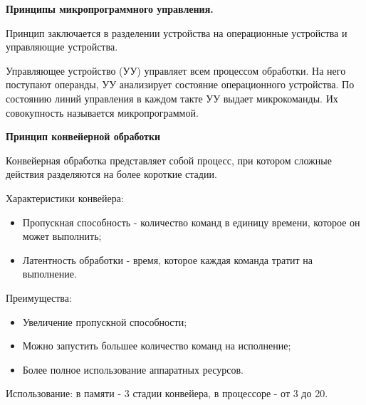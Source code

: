 
\textbf{Принципы микропрограммного управления.}


Принцип заключается в разделении устройства на операционные устройства и
управляющие устройства. 

Управляющее устройство (УУ) управляет всем процессом обработки. На него
поступают операнды, УУ анализирует состояние операционного устройства. По
состоянию линий управления в каждом такте УУ выдает микрокоманды. Их
совокупность называется микропрограммой.

\textbf{Принцип конвейерной обработки}

Конвейерная обработка представляет собой процесс, при котором сложные действия
разделяются на более короткие стадии. 

Характеристики конвейера:
\begin{itemize}[left=\parindent]
\item Пропускная способность - количество команд в единицу времени, которое он
может выполнить;
\item Латентность обработки - время, которое каждая команда тратит на
выполнение.
\end{itemize}

Преимущества:
\begin{itemize}[left=\parindent]
\item Увеличение пропускной способности;
\item Можно запустить большее количество команд на исполнение;
\item Более полное использование аппаратных ресурсов.
\end{itemize}

Использование: в памяти - 3 стадии конвейера, в процессоре - от 3 до 20.
